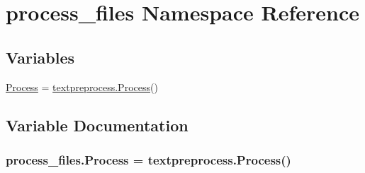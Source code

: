 \hypertarget{namespaceprocess__files}{}\section{process\+\_\+files Namespace Reference}
\label{namespaceprocess__files}
\subsection*{Variables}
\begin{DoxyCompactItemize}
\item 
\hyperlink{namespaceprocess__files_abbc7378ea51dac15aceb895e5aecd05a}{Process} = \hyperlink{classtextpreprocess_1_1_process}{textpreprocess.\+Process}()
\end{DoxyCompactItemize}


\subsection{Variable Documentation}
\subsubsection[{\texorpdfstring{Process}{Process}}]{\setlength{\rightskip}{0pt plus 5cm}process\+\_\+files.\+Process = {\bf textpreprocess.\+Process}()}\hypertarget{namespaceprocess__files_abbc7378ea51dac15aceb895e5aecd05a}{}\label{namespaceprocess__files_abbc7378ea51dac15aceb895e5aecd05a}
